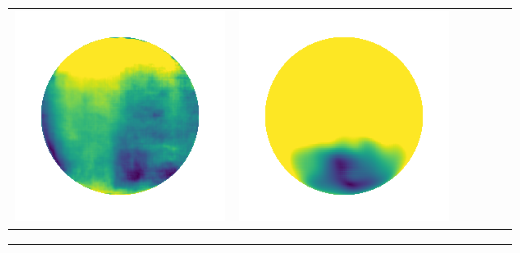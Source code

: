 \begin{tabularx}{\linewidth}{@{}Y@{}Y@{}Y@{}Y@{}Y@{}Y@{}}
\includegraphics[width=\linewidth]{semisynthetic/20160617_13_marrnet_err.png} &
\includegraphics[width=\linewidth]{semisynthetic/20160617_13_ef_err.png} \\
\end{tabularx}
\begin{center}\rule{0.5\linewidth}{\linethickness}\end{center}


